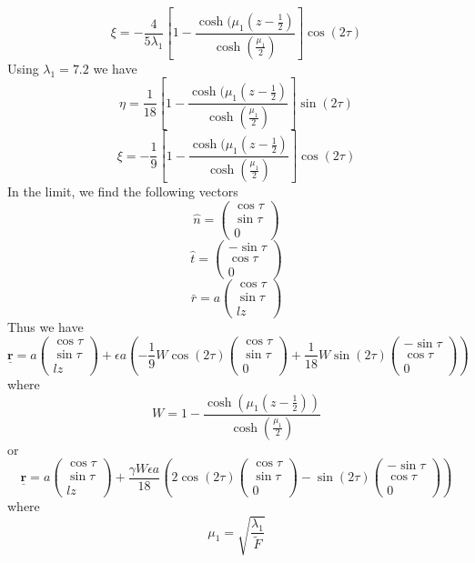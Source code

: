 \documentclass[12pt]{article}
\begin{document}
$$\xi=-\frac{4}{5\lambda_1}\left[1-\frac{\cosh(\mu_1(z-\frac{1}{2})}{\cosh(\frac{\mu_1}{2})}\right]\cos(2\tau)$$
Using $\lambda_1=7.2$ we have 
$$\eta = \frac{1}{18}\left[1-\frac{\cosh(\mu_1(z-\frac{1}{2})}{\cosh(\frac{\mu_1}{2})}\right]\sin(2\tau)$$
$$\xi=-\frac{1}{9}\left[1-\frac{\cosh(\mu_1(z-\frac{1}{2})}{\cosh(\frac{\mu_1}{2})}\right]\cos(2\tau)$$
In the limit, we find the following vectors $$\hat{n}=\begin{pmatrix}
\cos\tau \\ \sin\tau \\ 0
\end{pmatrix}$$ $$\hat{t}=\begin{pmatrix}
-\sin\tau \\ \cos\tau \\ 0
\end{pmatrix}$$ $$ \bar{r}=a\begin{pmatrix}
\cos\tau \\ \sin\tau \\ lz
\end{pmatrix}$$
Thus we have $$\underline{\textbf{r}}= a\begin{pmatrix}
\cos\tau \\ \sin\tau \\ lz
\end{pmatrix} + \epsilon a\left(-\frac{1}{9}W\cos(2\tau)\begin{pmatrix}
\cos\tau \\ \sin\tau \\ 0
\end{pmatrix} + \frac{1}{18}W\sin(2\tau)\begin{pmatrix}
-\sin\tau \\ \cos\tau \\ 0
\end{pmatrix}\right)$$ where $$W=1-\frac{\cosh(\mu_1(z-\frac{1}{2}))}{\cosh(\frac{\mu_1}{2})}$$
or $$\underline{\textbf{r}}= a\begin{pmatrix}
\cos\tau \\ \sin\tau \\ lz
\end{pmatrix} + \frac{\gamma W\epsilon a}{18}\left(2\cos(2\tau)\begin{pmatrix}
\cos\tau \\ \sin\tau \\ 0
\end{pmatrix} - \sin(2\tau)\begin{pmatrix}
-\sin\tau \\ \cos\tau \\ 0
\end{pmatrix}\right)$$
where $$\mu_1=\sqrt{\frac{\lambda_1}{\tilde{F}}}$$
\end{document}
